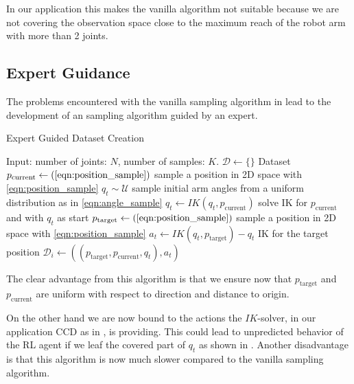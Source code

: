 In our application this makes the vanilla algorithm not suitable because we are not covering the observation space close to the maximum reach of the robot arm with more than 2 joints. 

\subsection{Expert Guidance}

The problems encountered with the vanilla sampling algorithm in  lead to the development of an sampling algorithm guided by an expert. 

\begin{algorithm}
    \caption{Expert Guided Dataset Creation}\label{alg:Expert_Dataset}
    \begin{algorithmic}
        \State{} Input: number of joints: $N$, number of samples: $K$.
        \State{} $\mathcal{D} \leftarrow \{\}$  Dataset
            \State{} $p_{\text{current}} \leftarrow (\text{\ref{eqn:position_sample}})$ sample a position in 2D space with \eqref{eqn:position_sample}
            \State{} $q_t \sim \mathcal{U}$ sample initial arm angles from a uniform distribution as in \eqref{eqn:angle_sample}
            \State{} $q_t \leftarrow IK(q_t, p_{\text{current}})$ solve IK for $p_{\text{current}}$ and with $q_t$ as start
            \State{} $p_{\text{target}} \leftarrow (\text{\ref{eqn:position_sample}})$ sample a position in 2D space with \eqref{eqn:position_sample}
            \State{} $a_t \leftarrow IK(q_t, p_{\text{target}}) - q_t$ IK for the target position
            \State{} $\mathcal{D}_i \leftarrow ((p_{\text{target}}, p_{\text{current}}, q_t), a_t)$
        \EndFor{}
\end{algorithmic}
\end{algorithm}
The clear advantage from this algorithm is that we ensure now that $p_{\text{target}}$ and $p_{\text{current}}$ are uniform with respect to direction and distance to origin.

On the other hand we are now  bound to the actions the $IK$-solver, in our application CCD as in , is providing. This could lead to unpredicted behavior of the RL agent if we leaf the covered part of $q_t$ as shown in . Another disadvantage is that this algorithm is now much slower compared to the vanilla sampling algorithm. 

